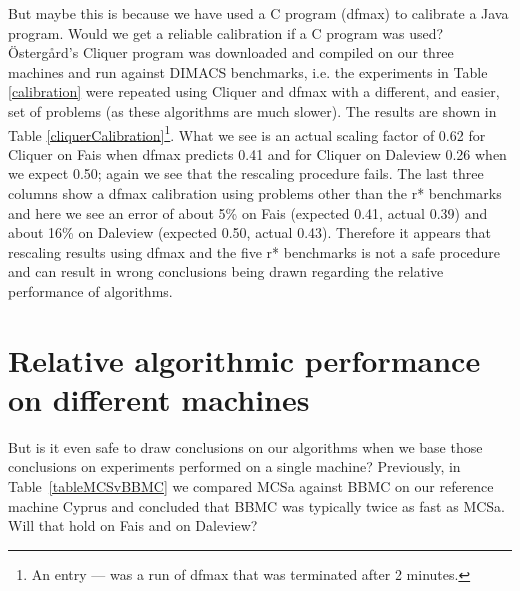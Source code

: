 \documentclass[runningheads]{llncs}
\begin{document}
But maybe this is because we have used a C program (dfmax) to calibrate a Java program. Would we get a reliable calibration if a C 
program was used? \"{O}sterg\aa{}rd's Cliquer program was downloaded and compiled on our three machines and run against
DIMACS benchmarks, i.e. the experiments in Table \ref{calibration} were repeated using Cliquer and dfmax with a different, and easier, 
set of problems (as these algorithms are much slower). The results are shown
in Table \ref{cliquerCalibration}\footnote{An entry --- was a run of dfmax that was terminated after 2 minutes.}. What we see is an actual 
scaling factor of 0.62 for Cliquer on Fais when dfmax predicts 0.41 
and for Cliquer on Daleview 0.26 when we expect 0.50; again we see that the rescaling procedure fails. The last three
columns show a dfmax calibration using problems other than the r* benchmarks and here we see an
error of about 5\% on Fais (expected 0.41, actual 0.39) and  about 16\% on Daleview (expected 0.50, actual 0.43). 
Therefore it appears that rescaling results using dfmax and the five r* benchmarks is not a safe procedure and can result in wrong
conclusions being drawn regarding the relative performance of algorithms.

\section{Relative algorithmic performance on different machines}
\vspace{-1.5mm}
But is it even safe to draw conclusions on our algorithms when we base those conclusions on experiments
performed on a single machine? Previously, in Table~\ref{tableMCSvBBMC} we compared MCSa against BBMC on our
reference machine Cyprus and concluded that BBMC was typically twice as fast as MCSa. Will that hold on
Fais and on Daleview? 
\end{document}
